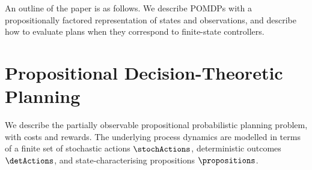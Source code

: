 \documentclass[letterpaper]{article}
\begin{document}

An outline of the paper is as follows. We describe POMDPs with a
propositionally factored representation of states and observations,
and describe how to evaluate plans when they correspond to
finite-state controllers.

\section{Propositional Decision-Theoretic Planning}



We describe the partially observable propositional probabilistic
planning problem, with costs and rewards. The underlying process
dynamics are modelled in terms of a finite set of stochastic actions
$\stochActions$, deterministic outcomes $\detActions$, and
state-characterising propositions $\propositions$.
\end{document}
